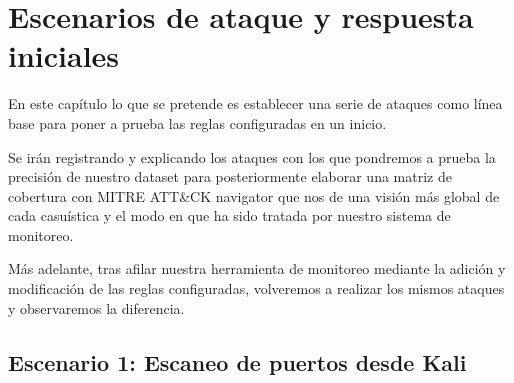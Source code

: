 \chapter{Escenarios de ataque y respuesta iniciales}\label{cap:escenarios}

En este capítulo lo que se pretende es establecer una serie de ataques como línea base para poner a prueba las reglas configuradas en un inicio. 

Se irán registrando y explicando los ataques con los que pondremos a prueba la precisión de nuestro dataset para posteriormente elaborar una matriz de cobertura con MITRE ATT\&CK navigator que nos de una visión más global de cada casuística y el modo en que ha sido tratada por nuestro sistema de monitoreo.

Más adelante, tras afilar nuestra herramienta de monitoreo mediante la adición y modificación de las reglas configuradas, volveremos a realizar los mismos ataques y observaremos la diferencia.

\section{Escenario 1: Escaneo de puertos desde Kali}\label{sec:esc-escaneo}

